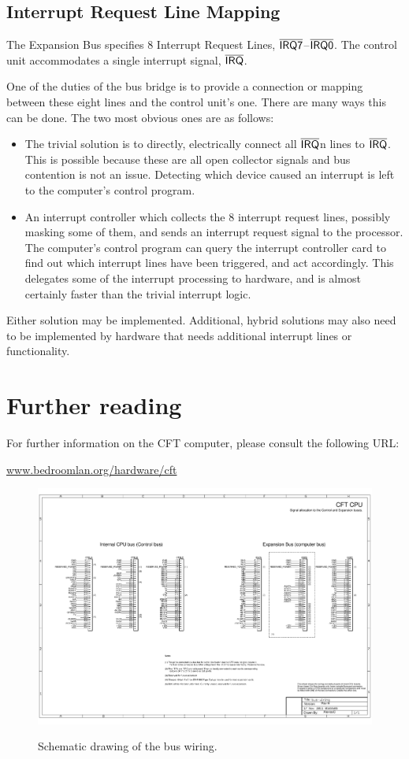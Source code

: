 \documentclass[11pt,a4paper,twocolumns]{article}
\newcommand\link[1]{\sf\href{http://#1}{#1}}
\newcommand{\ns}[1]{$\overline{\mbox{\textsf{{#1}}}}$}
\newcommand\IRQ{\ns{IRQ}}
\newcommand\IRQn[1]{\ns{IRQ{#1}}}
\begin{document}
\subsection{Interrupt Request Line Mapping}

The Expansion Bus specifies 8 Interrupt Request Lines,
\IRQn{7}–\IRQn{0}. The control unit accommodates a single interrupt
signal, \IRQ.

One of the duties of the bus bridge is to provide a connection or
mapping between these eight lines and the control unit's one. There
are many ways this can be done. The two most obvious ones are as follows:

\begin{itemize}
\item The trivial solution is to directly, electrically connect all
  \IRQ{n} lines to \IRQ. This is possible because these are all open
  collector signals and bus contention is not an issue. Detecting
  which device caused an interrupt is left to the computer's control
  program.
\item An interrupt controller which collects the 8 interrupt request
  lines, possibly masking some of them, and sends an interrupt request
  signal to the processor. The computer's control program can query
  the interrupt controller card to find out which interrupt lines have
  been triggered, and act accordingly. This delegates some of the
  interrupt processing to hardware, and is almost certainly faster
  than the trivial interrupt logic.
\end{itemize}

Either solution may be implemented. Additional, hybrid solutions may
also need to be implemented by hardware that needs additional
interrupt lines or functionality.

\section{Further reading}

For further information on the CFT computer, please consult the
following URL:

\begin{center}
\link{www.bedroomlan.org/hardware/cft}
\end{center}

\begin{figure}
\centering
\includegraphics[width=0.95\textheight,angle=90]{eagle/bus-wiring.pdf}\\
\caption{\label{fig-schematic-bus-wiring}Schematic drawing of the bus wiring.}
\end{figure}
\end{document}
